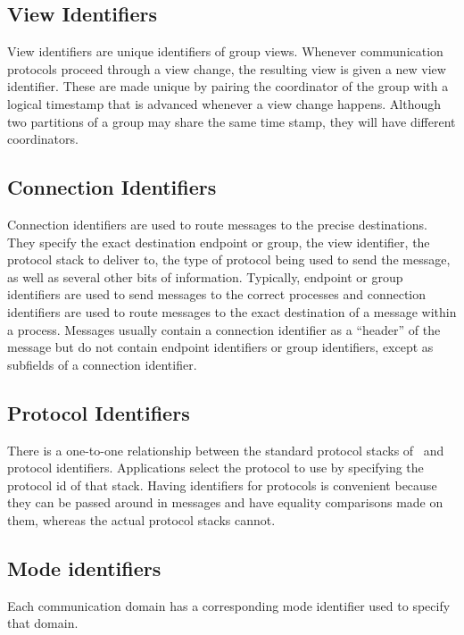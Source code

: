 \subsection{View Identifiers}
View identifiers are unique identifiers of group views.  Whenever
communication protocols proceed through a view change, the resulting
view is given a new view identifier.  These are made unique by pairing
the coordinator of the group with a logical timestamp that is advanced
whenever a view change happens.  Although two partitions of a group
may share the same time stamp, they will have different coordinators.

\subsection{Connection Identifiers}
Connection identifiers are used to route messages to the precise
destinations.  They specify the exact destination endpoint or group,
the view identifier, the protocol stack to deliver to, the type of
protocol being used to send the message, as well as several other bits
of information.  Typically, endpoint or group identifiers are used to
send messages to the correct processes and connection identifiers are
used to route messages to the exact destination of a message within a
process.  Messages usually contain a connection identifier as a
``header'' of the message but do not contain endpoint identifiers or
group identifiers, except as subfields of a connection identifier.

\subsection{Protocol Identifiers}
There is a one-to-one relationship between the standard protocol
stacks of \ensemble\ and protocol identifiers.  Applications select
the protocol to use by specifying the protocol id of that stack.
Having identifiers for protocols is convenient because they can be
passed around in messages and have equality comparisons made on them,
whereas the actual protocol stacks cannot.

\subsection{Mode identifiers}  
Each communication domain has a corresponding mode identifier used to
specify that domain.

